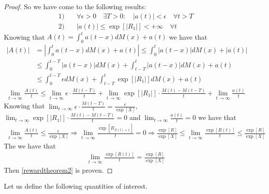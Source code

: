 \begin{proof}
	So we have come to the following results:
	\begin{align*}
		1) \quad & \forall \epsilon>0 \quad \exists T>0:\quad |a(t)|<\epsilon \quad \forall t>T
		\\ 2) \quad & |a(t)| \leq \exp[|R_1|]<+\infty \quad \forall t
	\end{align*}
	Knowing that $A(t)=\int_{0}^{t}a(t-x)dM(x)+a(t)$ we have that
	\begin{align*}
		|A(t)| & = |\int_{0}^{t}a(t-x)dM(x)+a(t)| \leq \int_{0}^{t}|a(t-x)|dM(x)+|a(t)|
		\\ & \leq \int_{0}^{t-T}|a(t-x)|dM(x)+ \int_{t-T}^{t}|a(t-x)|dM(x) + a(t)
		\\ & \leq \int_{0}^{t-T}\epsilon dM(x)+ \int_{t-T}^{t}\exp[|R_1|] dM(x) + a(t)
	\end{align*}
	\begin{align*}
		\lim_{t \to \infty} \frac{A(t)}{t} \leq \lim_{t \to \infty} \epsilon \cdot \frac{M(t-T)}{t} + \lim_{t \to \infty} \exp[|R_1|]\cdot \frac{M(t)-M(t-T)}{t} + \lim_{t \to \infty} \frac{a(t)}{t}
	\end{align*}
	Knowing that $\lim_{t \to \infty} \epsilon \cdot \frac{M(t-T)}{t}=\frac{\epsilon}{\exp[X]}$, $\lim_{t \to \infty} \exp[|R_1|]\cdot \frac{M(t)-M(t-T)}{t}=0$ and $\lim_{t \to \infty} \frac{a(t)}{t}=0$ we have that
	\begin{align*}
		\lim_{t \to \infty} \frac{A(t)}{t} \leq \frac{\epsilon}{\exp[X]} \Rightarrow \lim_{t \to \infty} \frac{\exp[R_{N(t)+1}]}{t}=0 \Rightarrow \frac {\exp[R]}{\exp[X]} \leq \lim_{t \to \infty} \frac{\exp[R(t)]}{t} \leq \frac{\exp[R]}{\exp[X]}
	\end{align*}
	The we have that
	\begin{align*}
		\lim_{t \to \infty} \frac{\exp[R(t)]}{t} = \frac{\exp[R]}{\exp[X]}
	\end{align*}
	Then \ref{rewardtheorem2} is proven.
\end{proof}

Let us define the following quantities of interest.

